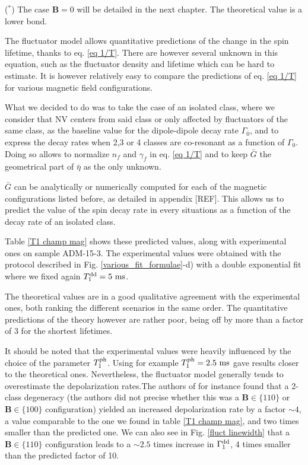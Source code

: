 \documentclass[a4paper,11pt]{report}
\begin{document}
\begin{refsection}
\begin{table}[htbp]
($^*$) The case $\mathbf{B}=0$ will be detailed in the next chapter. The theoretical value is a lower bond.
\end{table}

The fluctuator model allows quantitative predictions of the change in the spin lifetime, thanks to eq. \ref{eq 1/T}. There are however several unknown in this equation, such as the fluctuator density and lifetime which can be hard to estimate. It is however relatively easy to compare the predictions of eq. \ref{eq 1/T} for various magnetic field configurations.

What we decided to do was to take the case of an isolated class, where we consider that NV centers from said class or only affected by fluctuators of the same class, as the baseline value for the dipole-dipole decay rate $\Gamma_0$, and to express the decay rates when 2,3 or 4 classes are co-resonant as a function of $\Gamma_0$. Doing so allows to normalize $n_f$ and $\gamma_f$ in eq. \ref{eq 1/T} and to keep $\bar G$ the geometrical part of $\bar \eta$ as the only unknown.

$\bar G$ can be analytically or numerically computed for each of the magnetic configurations listed before, as detailed in appendix [REF]. This allows us to predict the value of the spin decay rate in every situations as a function of the decay rate of an isolated class.

Table \ref{T1 champ mag} shows these predicted values, along with experimental ones on sample ADM-15-3. The experimental values were obtained with the protocol described in Fig. \ref{various_fit_formulae}-d) with a double exponential fit where we fixed again $T_1^{\rm dd}=5\ \rm ms$.

The theoretical values are in a good qualitative agreement with the experimental ones, both ranking the different scenarios in the same order. The quantitative predictions of the theory however are rather poor, being off by more than a factor of 3 for the shortest lifetimes.

It should be noted that the experimental values were heavily influenced by the choice of the parameter $T_1^{\rm ph}$. Using for example $T_1^{\rm ph}=2.5\ \rm ms$ gave results closer to the theoretical ones. Nevertheless, the fluctuator model generally tends to overestimate the depolarization rates.The authors of \citep{choi2017depolarization} for instance found that a 2-class degeneracy (the authors did not precise whether this was a $\mathbf{B} \in \{110\}$ or $\mathbf{B} \in \{100\}$ configuration) yielded an increased depolarization rate by a factor $\sim 4$, a value comparable to the one we found in table \ref{T1 champ mag}, and two times smaller than the predicted one. We can also see in Fig. \ref{fluct linewidth} that a $\mathbf{B} \in \{110\}$ configuration leads to a $\sim 2.5$ times increase in $\Gamma_1^{\rm dd}$, 4 times smaller than the predicted factor of 10.


\end{refsection}
\end{document}
